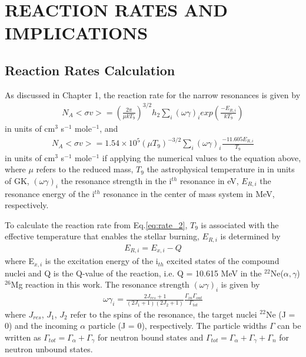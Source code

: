 
%
%

\chapter{REACTION RATES AND IMPLICATIONS}
\section{Reaction Rates Calculation}
As discussed in Chapter 1, the reaction rate for the narrow resonances is given by
 \begin{equation}
 \label{eq:rate_1}
    \begin{aligned}
         N_A<\sigma v> =( \frac{2 \pi}{\mu k T_9 })^{3/2}h_2 \sum_i(\omega \gamma)_i exp(\frac{-E_{R,i}}{kT_9})
        \end{aligned}
\end{equation}
in units of cm$^3$ s$^{-1}$ mole$^{-1}$, and
 \begin{equation}
 \label{eq:rate_2}
    \begin{aligned}
         N_A<\sigma v> = 1.54 \times 10^{5} (\mu T_9)^{-3/2} \sum_i (\omega \gamma)_i \frac{-11.605E_{R,i}}{T_9}
        \end{aligned}
\end{equation}
in units of cm$^3$ s$^{-1}$ mole$^{-1}$ if applying the numerical values to the equation above, where $\mu$ refers to the reduced mass, $T_9$ the astrophysical temperature in in units of GK, $ (\omega \gamma)_i$ the resonance strength in the i$^{th}$ resonance in eV, $E_{R,i}$ the resonance energy of the  i$^{th}$ resonance in the center of mass system in MeV, respectively.

To calculate the reaction rate from Eq.\ref{eq:rate_2}, $T_9$ is associated with the effective temperature that  enables the stellar  burning, $E_{R,i}$  is determined by
 \begin{equation}
 \label{eq:Er}
    \begin{aligned}
    E_{R,i} = E_{x,i} - Q
        \end{aligned}
\end{equation}
where E$_{x,i}$ is the excitation energy of the i$_{th}$ excited states of the compound nuclei and Q is the Q-value of the reaction, i.e. Q = 10.615 MeV in the $^{22}$Ne($\alpha,\gamma$)$^{26}$Mg reaction in this work.
The resonance strength  $(\omega \gamma)_i$ is given by
 \begin{equation}
    \label{eq:strength}
    \begin{aligned}
    \omega \gamma_{i} = \frac{2J_{res} + 1}{(2J_1 + 1)(2J_2 + 1)} \frac{\Gamma_{in} \Gamma_{out}}{\Gamma_{tot}}
        \end{aligned}
\end{equation}
where $J_{res}$, $J_1$, $J_2$ refer to the spins of the resonance, the target nuclei $^{22}$Ne (J = 0) and the incoming $\alpha$ particle (J = 0), respectively. The particle widths  $\Gamma$ can be written as $\Gamma_{tot} = \Gamma_\alpha + \Gamma_\gamma$ for neutron bound states and  $\Gamma_{tot} = \Gamma_\alpha + \Gamma_\gamma + \Gamma_n$ for neutron unbound states.

